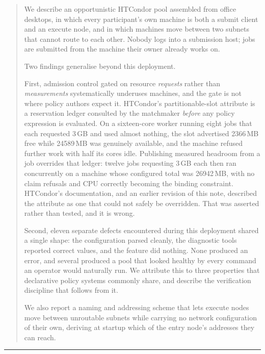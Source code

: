 \documentclass[11pt,a4paper]{article}
\begin{document}
\begin{abstract}
\noindent
We describe an opportunistic HTCondor pool assembled from office desktops, in
which every participant's own machine is both a submit client and an execute
node, and in which machines move between two subnets that cannot route to each
other. Nobody logs into a submission host; jobs are submitted from the machine
their owner already works on.

Two findings generalise beyond this deployment.

First, admission control gated on resource \emph{requests} rather than
\emph{measurements} systematically underuses machines, and the gate is not where
policy authors expect it. HTCondor's partitionable-slot  attribute is
a reservation ledger consulted by the matchmaker \emph{before} any policy
expression is evaluated. On a sixteen-core worker running eight jobs that each
requested 3\,GB and used almost nothing, the slot advertised 2366\,MB free while
24589\,MB was genuinely available, and the machine refused further work with
half its cores idle. Publishing measured headroom from a  job
overrides that ledger: twelve jobs requesting 3\,GB each then ran concurrently
on a machine whose configured total was 26942\,MB, with no claim refusals and
CPU correctly becoming the binding constraint. HTCondor's documentation, and an
earlier revision of this note, described the attribute as one that could not
safely be overridden. That was asserted rather than tested, and it is wrong.

Second, eleven separate defects encountered during this deployment shared a
single shape: the configuration parsed cleanly, the diagnostic tools reported
correct values, and the feature did nothing. None produced an error, and several
produced a pool that looked healthy by every command an operator would naturally
run. We attribute this to three properties that declarative policy systems
commonly share, and describe the verification discipline that follows from it.

We also report a naming and addressing scheme that lets execute nodes move
between unroutable subnets while carrying no network configuration of their own,
deriving at startup which of the entry node's addresses they can reach.
\end{abstract}

\vspace{0.8em}
{\color{RuleGrey}\hrule height 0.5pt}
\vspace{1.2em}

\hypersetup{pageanchor=true}
\setcounter{page}{1}












\appendix


\end{document}
